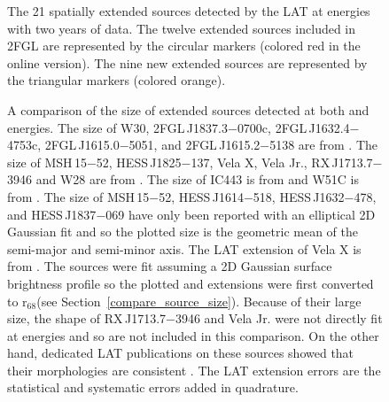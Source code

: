 \documentclass[12pt,preprint]{aastex}
\newif\ifcolorfigure
\newcommand{\gev}{\text{GeV}\xspace}
\newcommand{\tev}{\text{TeV}\xspace}
\newcommand{\rsixeight}{{\ensuremath{\text{r}_{68}}}\xspace}
\begin{document}
\clearpage
  \begin{figure}
      \ifcolorfigure
      \plotone{summary_plots/allsky_extended_sources_color.eps}
      \else
      \fi
      \caption{The 21
      spatially extended sources detected by the LAT
      at \gev energies 
      with two years of data.  The twelve extended sources included in
      2FGL are represented by the circular markers (colored red in the online
      version).  The nine new extended sources are represented by
      the triangular markers (colored orange).}
\label{allsky_extended_sources}
  \end{figure}


\clearpage
\begin{figure}
    \ifcolorfigure
      \plotone{summary_plots/gev_vs_tev_plot_color.eps}
    \else
      \fi
    \caption{
    A comparison of the size of extended sources detected at
    both \gev and \tev energies.  The \tev size of W30,
    2FGL\,J1837.3$-$0700c, 2FGL\,J1632.4$-$4753c, 2FGL\,J1615.0$-$5051,
    and 2FGL\,J1615.2$-$5138 are from \cite{hess_plane_survey}.
    The \tev size of MSH\,15$-$52, HESS\,J1825$-$137,
    Vela X, Vela Jr., RX\,J1713.7$-$3946 and W28 are from
    \cite{msh_15_52_hess,hess_j1825_hess,vela_x_hess,vela_jr_hess,rx_j1713_hess,w28_hess}.
    The \tev size of IC443 is from \cite{ic443_veritas} and
    W51C is from \cite{w51c_with_magic_at_fermi_symposium}.  The \tev
    size of MSH\,15$-$52, HESS\,J1614$-$518, HESS\,J1632$-$478, and
    HESS\,J1837$-$069 have only been reported with an elliptical 2D
    Gaussian fit and so the plotted size is the geometric 
    mean of the semi-major and semi-minor axis.
    The LAT extension of
    Vela X is from \cite{velax}. 
    The \tev sources were fit assuming a 2D Gaussian surface brightness profile
    so the plotted \gev and \tev extensions were first converted to
    \rsixeight (see Section~\ref{compare_source_size}).  
    Because of
    their large size, the shape of RX\,J1713.7$-$3946 and Vela Jr.
    were not directly fit at \tev energies and so are not included
    in this comparison. On the other hand, dedicated LAT publications on
    these sources showed that their morphologies are consistent
    \citep{rx_j1713_lat,vela_jr_lat}.
    The LAT
    extension errors are the statistical and systematic errors added
    in quadrature. 
}\label{gev_vs_tev_plot}
  \end{figure}
\end{document}
